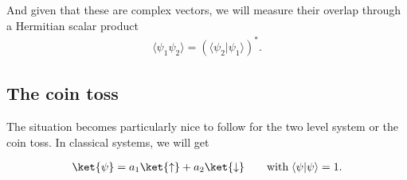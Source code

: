 And given that these are complex vectors, we will measure their overlap through a Hermitian scalar product
\begin{align}
				\langle\psi_1 \psi_2\rangle=(\langle{\psi_2}| \psi_1\rangle)^*.
\end{align}
\subsection{The coin toss}
The situation becomes particularly nice to follow for the two level system or the coin toss. In classical systems, we will get 

\begin{align}
	\ket{\psi} = a_1 \ket{\uparrow} + a_2 \ket{\downarrow}  \qquad \text{with} \; \langle\psi | \psi\rangle = 1.
\end{align}